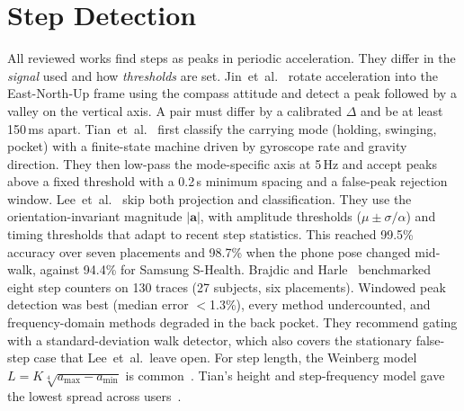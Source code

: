 \section{Step Detection}
All reviewed works find steps as peaks in periodic acceleration. They
differ in the \emph{signal} used and how \emph{thresholds} are set.
Jin~et~al.~\cite{jin2011} rotate acceleration into the East-North-Up
frame using the compass attitude and detect a peak followed by a valley
on the vertical axis. A pair must differ by a calibrated $\Delta$ and be
at least 150\,ms apart. Tian~et~al.~\cite{tian2016} first classify the
carrying mode (holding, swinging, pocket) with a finite-state machine
driven by gyroscope rate and gravity direction. They then low-pass the
mode-specific axis at 5\,Hz and accept peaks above a fixed threshold with
a 0.2\,s minimum spacing and a false-peak rejection window. Lee~et~al.~\cite{lee2015} skip both projection and classification. They use
the orientation-invariant magnitude $|\mathbf{a}|$, with amplitude
thresholds ($\mu\pm\sigma/\alpha$) and timing thresholds that adapt to
recent step statistics. This reached 99.5\% accuracy over seven
placements and 98.7\% when the phone pose changed mid-walk, against
94.4\% for Samsung S-Health. Brajdic and Harle~\cite{brajdic2013}
benchmarked eight step counters on 130 traces (27 subjects, six
placements). Windowed peak detection was best (median error $<$1.3\%),
every method undercounted, and frequency-domain methods degraded in the
back pocket. They recommend gating with a standard-deviation walk
detector, which also covers the stationary false-step case that
Lee~et~al.\ leave open. For step length, the Weinberg model
$L=K\sqrt[4]{a_{\max}-a_{\min}}$ is common~\cite{jin2011,kuang2018}.
Tian's height and step-frequency model gave the lowest spread across
users~\cite{tian2016}.

